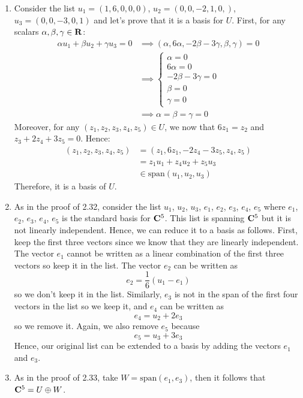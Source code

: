 \begin{solution}
    \begin{enumerate}[label=(\alph*)]
        \item Consider the list $u_1 = (1,6, 0,0,0)$, $u_2 = (0,0,-2,1,0,)$, $u_3 =  (0,0,-3,0,1)$ and let's prove that it is a basis for $U$. First, for any scalars $\alpha, \beta, \gamma \in \mathbf{R}$:
        \begin{align*}
            \alpha u_1 + \beta u_2 +\gamma u_3 = 0 &\implies (\alpha, 6\alpha, -2\beta-3\gamma, \beta, \gamma) = 0 \\
            &\implies \begin{cases}
                \alpha = 0 \\ 6\alpha = 0 \\-2\beta-3\gamma = 0 \\ \beta = 0 \\ \gamma = 0
            \end{cases} \\
            &\implies \alpha = \beta = \gamma = 0
        \end{align*}
        Moreover, for any $(z_1, z_2, z_3, z_4, z_5) \in U$, we now that $6z_1 = z_2$ and $z_3 + 2z_4 + 3z_5 = 0$. Hence:
        \begin{align*}
            (z_1, z_2, z_3, z_4, z_5) &= (z_1, 6z_1, -2z_4-3z_5, z_4, z_5) \\
            &= z_1u_1 + z_4u_2+ z_5 u_3 \\
            &\in \text{span}(u_1, u_2, u_3)
        \end{align*}
        Therefore, it is a basis of $U$.
        \item As in the proof of 2.32, consider the list $u_1$, $u_2$, $u_3$, $e_1$, $e_2$, $e_3$, $e_4$, $e_5$ where $e_1$, $e_2$, $e_3$, $e_4$, $e_5$ is the standard basis for $\mathbf{C}^5$. This list is spanning $\mathbf{C}^5$ but it is not linearly independent. Hence, we can reduce it to a basis as follows. First, keep the first three vectors since we know that they are linearly independent. The vector $e_1$ cannot be written as a linear combination of the first three vectors so keep it in the list. The vector $e_2$ can be written as
        $$e_2 = \frac{1}{6}(u_1 -  e_1)$$
        so we don't keep it in the list. Similarly, $e_3$ is not in the span of the first four vectors in the list so we keep it, and $e_4$ can be written as
        $$e_4 = u_2 + 2e_3$$
        so we remove it. Again, we also remove $e_5$ because
        $$e_5 = u_3 + 3e_3$$
        Hence, our original list can be extended to a basis by adding the vectors $e_1$ and $e_3$.
        \item As in the proof of 2.33, take $W = \text{span}(e_1, e_3)$, then it follows that $\mathbf{C}^5 = U \oplus W$.\\
    \end{enumerate}
\end{solution}

